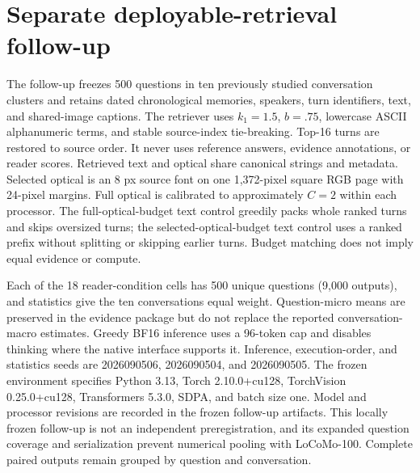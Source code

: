 \documentclass{article}
\begin{document}
\section{Separate deployable-retrieval follow-up}
\label{app:followup}

The follow-up freezes 500 questions in ten previously studied conversation clusters and retains dated chronological memories, speakers, turn identifiers, text, and shared-image captions. The retriever uses $k_1=1.5$, $b=.75$, lowercase ASCII alphanumeric terms, and stable source-index tie-breaking. Top-16 turns are restored to source order. It never uses reference answers, evidence annotations, or reader scores. Retrieved text and optical share canonical strings and metadata. Selected optical is an 8 px source font on one 1,372-pixel square RGB page with 24-pixel margins. Full optical is calibrated to approximately $C=2$ within each processor. The full-optical-budget text control greedily packs whole ranked turns and skips oversized turns; the selected-optical-budget text control uses a ranked prefix without splitting or skipping earlier turns. Budget matching does not imply equal evidence or compute.

Each of the 18 reader-condition cells has 500 unique questions (9,000 outputs), and statistics give the ten conversations equal weight. Question-micro means are preserved in the evidence package but do not replace the reported conversation-macro estimates. Greedy BF16 inference uses a 96-token cap and disables thinking where the native interface supports it. Inference, execution-order, and statistics seeds are 2026090506, 2026090504, and 2026090505. The frozen environment specifies Python 3.13, Torch 2.10.0+cu128, TorchVision 0.25.0+cu128, Transformers 5.3.0, SDPA, and batch size one. Model and processor revisions are recorded in the frozen follow-up artifacts. This locally frozen follow-up is not an independent preregistration, and its expanded question coverage and serialization prevent numerical pooling with LoCoMo-100. Complete paired outputs remain grouped by question and conversation.

\begin{table}[H]
  \centering\small
  \caption{Follow-up paired differences in conversation-macro F1. Percentile intervals resample ten whole conversations 50,000 times. They are pointwise and conditional on this small cluster sample, not population-equivalence bounds.}
  \label{tab:followup-contrasts}
  
\end{table}
\end{document}
